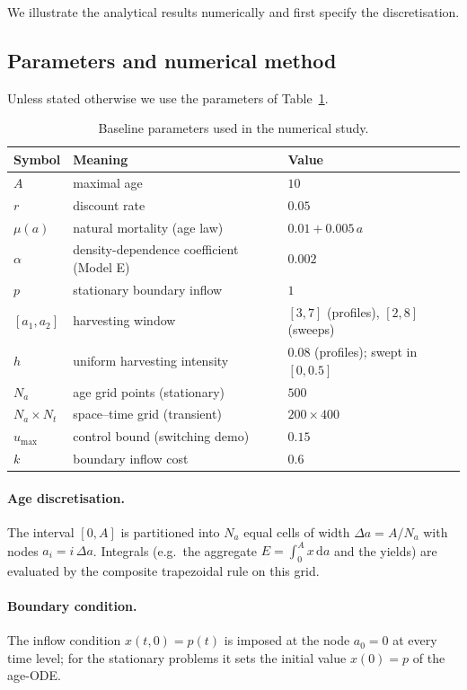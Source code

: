 \documentclass[pdflatex,sn-mathphys-num]{sn-jnl}
\theoremstyle{definition}
\theoremstyle{remark}
\newcommand{\dd}{\,\mathrm{d}}
\begin{document}
We illustrate the analytical results numerically and first specify the discretisation.


\subsection{Parameters and numerical method}
\label{subsec:method}

Unless stated otherwise we use the parameters of
Table~\ref{tab:parameters}.

\begin{table}[htbp]
\centering
\caption{Baseline parameters used in the numerical study.}
\label{tab:parameters}
\begin{tabular}{@{}lll@{}}
\toprule
Symbol & Meaning & Value \\
\midrule
$A$ & maximal age & $10$ \\
$r$ & discount rate & $0.05$ \\
$\mu(a)$ & natural mortality (age law) & $0.01+0.005\,a$ \\
$\alpha$ & density-dependence coefficient (Model E) & $0.002$ \\
$p$ & stationary boundary inflow & $1$ \\
$[a_1,a_2]$ & harvesting window & $[3,7]$ (profiles), $[2,8]$ (sweeps) \\
$h$ & uniform harvesting intensity & $0.08$ (profiles); swept in $[0,0.5]$ \\
$N_a$ & age grid points (stationary) & $500$ \\
$N_a\times N_t$ & space--time grid (transient) & $200\times400$ \\
$u_{\max}$ & control bound (switching demo) & $0.15$ \\
$k$ & boundary inflow cost & $0.6$ \\
\bottomrule
\end{tabular}
\end{table}

\paragraph{Age discretisation.}
The interval $[0,A]$ is partitioned into $N_a$ equal cells of width
$\Delta a=A/N_a$ with nodes $a_i=i\,\Delta a$. Integrals (e.g.\ the aggregate
$E=\int_0^A x\dd a$ and the yields) are evaluated by the composite trapezoidal
rule on this grid.

\paragraph{Boundary condition.}
The inflow condition $x(t,0)=p(t)$ is imposed at the node $a_0=0$ at
every time level; for the stationary problems it sets the initial value
$x(0)=p$ of the age-ODE.
\end{document}
